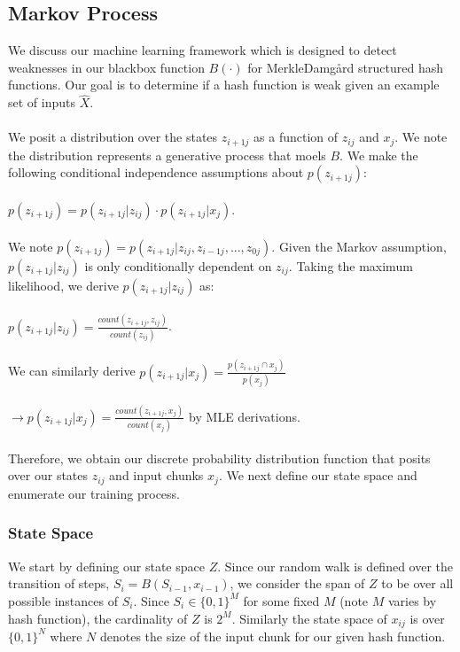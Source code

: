 \subsection{Markov Process}
We discuss our machine learning framework which is designed to detect weaknesses in our blackbox function $B(\cdot)$ for Merkle{\textendash}Damg\r{a}rd structured hash functions. Our goal is to determine if a hash function is weak given an example set of inputs $\hat{X}$. 
\\
\\
We posit a distribution over the states $z_{i+1j}$ as a function of $z_{ij}$ and $x_{j}$. We note the distribution represents a generative process that moels $B$. We make the following conditional independence assumptions about $p(z_{i+1j})$:
\\
\\
$p(z_{i+1j}) = p(z_{i+1j} | z_{ij}) \cdot p(z_{i+1j} | x_{j})$. 
\\
\\
We note $p(z_{i+1j}) = p(z_{i+1j} | z_{ij}, z_{i-1j},..., z_{0j})$. Given the Markov assumption, $p(z_{i+1j} | z_{ij})$ is only conditionally dependent on $z_{ij}$. Taking the maximum likelihood, we derive $p(z_{i+1j} | z_{ij})$ as:
\\
\\
$p(z_{i+1j} | z_{ij}) = \frac{count(z_{i+1j}, z_{ij})}{count(z_{ij})}$. 
\\
\\
We can similarly derive $p(z_{i+1j} | x_{j}) = \frac{p(z_{i+1j} \cap x_{j})}{p(x_{j})}$ 
\\
\\
$\rightarrow p(z_{i+1j} | x_{j}) = \frac{count(z_{i+1j}, x_{j})}{count(x_{j})}$ by MLE derivations. 
\\
\\
Therefore, we obtain our discrete probability distribution function that posits over our states $z_{ij}$ and input chunks $x_{j}$. We next define our state space and enumerate our training process.


\subsubsection{State Space}
We start by defining our state space $Z$. Since our random walk is defined over the transition of steps, $S_{i} = B(S_{i-1}, x_{i-1})$, we consider the span of $Z$ to be over all possible instances of $S_{i}$. Since $S_{i} \in \{0, 1\}^{M}$ for some fixed $M$ (note $M$ varies by hash function), the cardinality of $Z$ is $2^{M}$. Similarly the state space of $x_{ij}$ is over $ \{0, 1\}^{N}$ where $N$ denotes the size of the input chunk for our given hash function.


